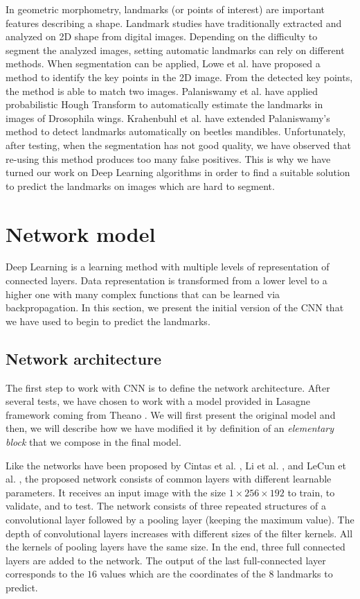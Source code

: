 \documentclass[10pt]{article}
\begin{document}
In geometric morphometry, landmarks (or points of interest) are important features describing a shape. Landmark studies have traditionally extracted and 
analyzed on 2D shape from digital images. Depending on the difficulty to segment the analyzed images, setting automatic landmarks can rely on different methods. When segmentation can be applied, Lowe et
al. \cite{lowe2004distinctive} have proposed a method to identify the
key points in the 2D image. From the detected key points, the method
is able to match two images. Palaniswamy et
al. \cite{palaniswamy2010automatic} have applied probabilistic Hough
Transform to automatically estimate the landmarks in images of
Drosophila wings. Krahenbuhl et al. \cite{le2017maelab} have extended
Palaniswamy's method to detect landmarks automatically on beetles
mandibles. Unfortunately, after testing, when the segmentation has not good quality,
we have observed that re-using this method produces too many
false positives. This is why we have turned our work on Deep Learning
algorithms in order to find a suitable solution to predict the landmarks
on images which are hard to segment.


\section{Network model}
Deep Learning is a learning method with multiple levels of
representation of connected layers. 
Data representation is transformed from a lower level to a
higher one with many complex functions that can be learned via
backpropagation. 
In this section, we present the initial version of the CNN that we have used
to begin to predict the landmarks. 

\subsection{Network architecture}
\label{secmodel}
The first step to work with CNN is to define the network
architecture. After several tests, we have chosen to work with a model provided in Lasagne framework \cite{lasagne} coming from
Theano \cite{2016arXiv160502688short}. We will first present the
original model and then, we will describe how we have modified it by definition of an
\textit{elementary block} that we compose in the final model.

Like the networks have been proposed by Cintas et al. \cite{cintas2016automatic}, Li et al. \cite{li2015convolutional}, and  LeCun et al. \cite{lecun2010convolutional}, the proposed network consists of common layers
with different learnable parameters. It receives an input image with
the size  $1 \times 256 \times 192$ to train, to validate, and to
test. The network consists of three repeated structures of a convolutional layer
followed by a pooling layer (keeping the maximum value). The depth of convolutional layers increases with different sizes of the filter kernels.
All the kernels of pooling layers have the same size. 
In the end, three full connected layers are added to the
network. The output of the last full-connected
layer corresponds to the $16$ values which are the coordinates of the
$8$ landmarks to predict.
\end{document}
